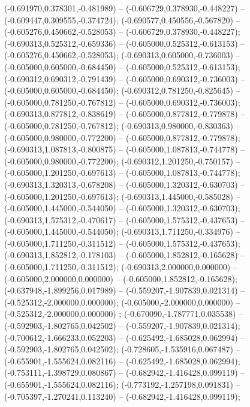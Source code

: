  (-0.691970,0.378301,-0.481989) -- (-0.606729,0.378930,-0.448227) -- (-0.609447,0.309555,-0.374724);
 (-0.690577,0.450556,-0.567820) -- (-0.605276,0.450662,-0.528053) -- (-0.606729,0.378930,-0.448227);
 (-0.690313,0.525312,-0.659336) -- (-0.605000,0.525312,-0.613153) -- (-0.605276,0.450662,-0.528053);
 (-0.690313,0.605000,-0.736003) -- (-0.605000,0.605000,-0.684450) -- (-0.605000,0.525312,-0.613153);
 (-0.690312,0.690312,-0.791439) -- (-0.605000,0.690312,-0.736003) -- (-0.605000,0.605000,-0.684450);
 (-0.690312,0.781250,-0.825645) -- (-0.605000,0.781250,-0.767812) -- (-0.605000,0.690312,-0.736003);
 (-0.690313,0.877812,-0.838619) -- (-0.605000,0.877812,-0.779878) -- (-0.605000,0.781250,-0.767812);
 (-0.690313,0.980000,-0.830363) -- (-0.605000,0.980000,-0.772200) -- (-0.605000,0.877812,-0.779878);
 (-0.690313,1.087813,-0.800875) -- (-0.605000,1.087813,-0.744778) -- (-0.605000,0.980000,-0.772200);
 (-0.690312,1.201250,-0.750157) -- (-0.605000,1.201250,-0.697613) -- (-0.605000,1.087813,-0.744778);
 (-0.690313,1.320313,-0.678208) -- (-0.605000,1.320312,-0.630703) -- (-0.605000,1.201250,-0.697613);
 (-0.690313,1.445000,-0.585028) -- (-0.605000,1.445000,-0.544050) -- (-0.605000,1.320312,-0.630703);
 (-0.690313,1.575312,-0.470617) -- (-0.605000,1.575312,-0.437653) -- (-0.605000,1.445000,-0.544050);
 (-0.690313,1.711250,-0.334976) -- (-0.605000,1.711250,-0.311512) -- (-0.605000,1.575312,-0.437653);
 (-0.690313,1.852812,-0.178103) -- (-0.605000,1.852812,-0.165628) -- (-0.605000,1.711250,-0.311512);
 (-0.690313,2.000000,0.000000) -- (-0.605000,2.000000,0.000000) -- (-0.605000,1.852812,-0.165628);
 (-0.637948,-1.899256,0.017989) -- (-0.559207,-1.907839,0.021314) -- (-0.525312,-2.000000,0.000000);
 (-0.605000,-2.000000,0.000000) -- (-0.525312,-2.000000,0.000000) ;
 (-0.670090,-1.787771,0.035538) -- (-0.592903,-1.802765,0.042502) -- (-0.559207,-1.907839,0.021314);
 (-0.700612,-1.666233,0.052203) -- (-0.625492,-1.685028,0.062994) -- (-0.592903,-1.802765,0.042502);
 (-0.728605,-1.535916,0.067487) -- (-0.655901,-1.555624,0.082116) -- (-0.625492,-1.685028,0.062994);
 (-0.753111,-1.398729,0.080867) -- (-0.682942,-1.416428,0.099119) -- (-0.655901,-1.555624,0.082116);
 (-0.773192,-1.257198,0.091831) -- (-0.705397,-1.270241,0.113240) -- (-0.682942,-1.416428,0.099119);
